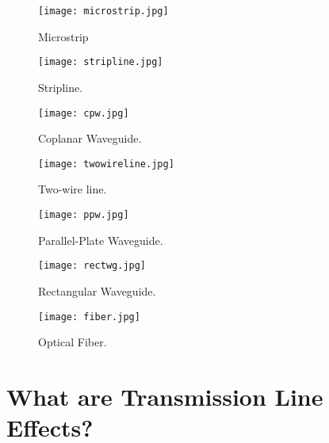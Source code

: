 \documentclass{ximera}
\begin{document}
\begin{figure}[ht!]
\begin{center}
\texttt{[image: microstrip.jpg]}
\caption{\label{fig:qm/MStrip} Microstrip}
\end{center}
\end{figure}

\begin{figure}[ht!]
\begin{center}
\texttt{[image: stripline.jpg]}
\caption{\label{fig:qm/Strp} Stripline.}
\end{center}
\end{figure}

\begin{figure}[ht!]
\begin{center}
\texttt{[image: cpw.jpg]}
\caption{\label{fig:qm/CPW} Coplanar Waveguide.}
\end{center}
\end{figure}

\begin{figure}[ht!]
\begin{center}
\texttt{[image: twowireline.jpg]}
\caption{\label{fig:qm/TwoWL} Two-wire line.}
\end{center}
\end{figure}

\begin{figure}[ht!]
\begin{center}
\texttt{[image: ppw.jpg]}
\caption{\label{fig:qm/PPW} Parallel-Plate Waveguide.}
\end{center}
\end{figure}

\begin{figure}[ht!]
\begin{center}
\texttt{[image: rectwg.jpg]}
\caption{\label{fig:qm/RecWG} Rectangular Waveguide.}
\end{center}
\end{figure}

\begin{figure}[ht!]
\begin{center}
\texttt{[image: fiber.jpg]}
\caption{\label{fig:qm/OF} Optical Fiber.}
\end{center}
\end{figure}


\section{What are Transmission Line Effects?}
\end{document}
